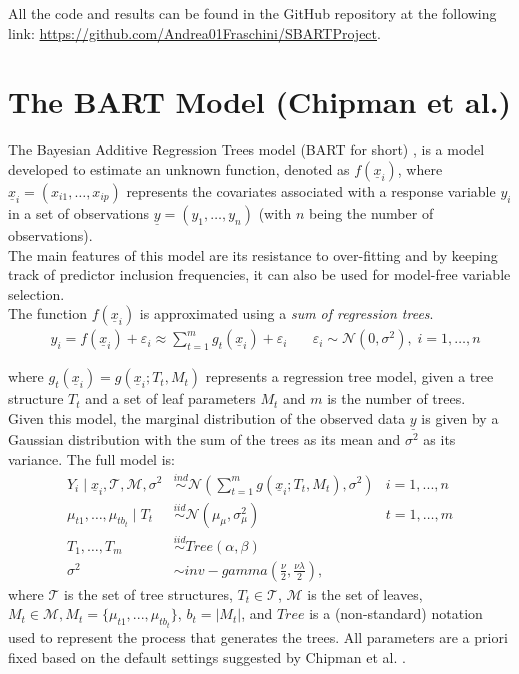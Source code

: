 \documentclass[11pt,a4paper]{article}
\begin{document}
All the code and results can be found in the GitHub repository at the following link: \url{https://github.com/Andrea01Fraschini/SBARTProject}.

\section{The BART Model (Chipman et al.)}
\label{sec:BARTmodel}
The Bayesian Additive Regression Trees model (BART for short) \cite{Chipman_2010}, is a model developed to estimate an unknown function, denoted as $f(\underline{x}_i)$, where $\underline{x}_i = (x_{i1}, \dots, x_{ip})$ represents the covariates associated with a response variable $y_i$ in a set of observations $\underline{y} = (y_1, \dots, y_n)$ (with $n$ being the number of observations).
\\
The main features of this model are its resistance to over-fitting and by keeping track of predictor inclusion
frequencies, it can also be used for model-free variable selection.
\\
The function $f(\underline{x}_i)$ is approximated using a \textit{sum of regression trees}.
\begin{align}
     & y_i = f(\underline{x}_i) + \varepsilon_i \approx \sum_{t=1}^m g_t(\underline{x}_i) + \varepsilon_i & \quad \varepsilon_i \sim \mathcal{N}(0, \sigma^2), \; i = 1, \dots, n
\end{align}

where $g_t(\underline{x}_i) = g(\underline{x}_i; T_t, M_t)$ represents a regression tree model, given a tree structure $T_t$ and a set of leaf parameters $M_t$ and $m$ is the number of trees.
\\
Given this model, the marginal distribution of the observed data $\underline{y}$ is given by a Gaussian distribution with the sum of the trees as its mean and $\sigma^2$ as its variance. The full model is:
\begin{align}
    Y_i \mid \underline{x}_i, \mathcal{T}, \mathcal{M}, \sigma^2 & \stackrel{ind}{\sim} \mathcal{N}\left(\sum_{t=1}^mg\left(\underline{x}_i;  T_t, M_t\right), \sigma^2\right) & i = 1,...,n   \\
    \mu_{t1}, \dots, \mu_{tb_t} \mid T_t                         & \stackrel{iid}{\sim} \mathcal{N}(\mu_{\mu}, \sigma^2_{\mu})                                                 & t = 1,\dots,m \\
    T_1, \dots, T_m                                              & \stackrel{iid}{\sim} Tree(\alpha, \beta)                                                                    &               \\
    \sigma^2                                                     & \sim inv-gamma\left(\frac{\nu}{2}, \frac{\nu\lambda}{2}\right),                                             &
\end{align}
where $\mathcal{T}$ is the set of tree structures, $T_t \in \mathcal{T}$, $\mathcal{M}$ is the set of leaves, $M_t \in \mathcal{M}, M_t = \{\mu_{t1}, ... , \mu_{tb_t}\}$, $b_t = |M_t|$, and $Tree$ is a (non-standard) notation used to represent the process that generates the trees. All parameters are a priori fixed based on the default settings suggested by Chipman et al. \cite{Chipman_2010}.
\end{document}
